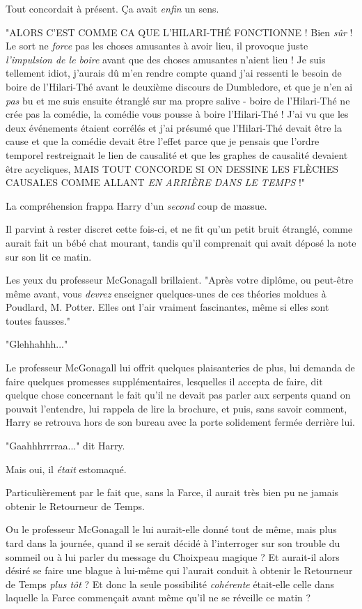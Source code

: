Tout concordait à présent. Ça avait \emph{enfin}  un sens.

"ALORS C'EST COMME CA QUE L'HILARI-THÉ FONCTIONNE ! Bien \emph{sûr}  ! Le sort ne \emph{force}  pas les choses amusantes à avoir lieu, il provoque juste \emph{l'impulsion de le boire}  avant que des choses amusantes n'aient lieu ! Je suis tellement idiot, j'aurais dû m'en rendre compte quand j'ai ressenti le besoin de boire de l'Hilari-Thé avant le deuxième discours de Dumbledore, et que je n'en ai \emph{pas}  bu et me suis ensuite étranglé sur ma propre salive - boire de l'Hilari-Thé ne crée pas la comédie, la comédie vous pousse à boire l'Hilari-Thé ! J'ai vu que les deux événements étaient corrélés et j'ai présumé que l'Hilari-Thé devait être la cause et que la comédie devait être l'effet parce que je pensais que l'ordre temporel restreignait le lien de causalité et que les graphes de causalité devaient être acycliques, MAIS TOUT CONCORDE SI ON DESSINE LES FLÈCHES CAUSALES COMME ALLANT \emph{EN ARRIÈRE DANS LE TEMPS}  !"

La compréhension frappa Harry d'un \emph{second}  coup de massue.

Il parvint à rester discret cette fois-ci, et ne fit qu'un petit bruit étranglé, comme aurait fait un bébé chat mourant, tandis qu'il comprenait qui avait déposé la note sur son lit ce matin.

Les yeux du professeur McGonagall brillaient. "Après votre diplôme, ou peut-être même avant, vous \emph{devrez } enseigner quelques-unes de ces théories moldues à Poudlard, M. Potter. Elles ont l'air vraiment fascinantes, même si elles sont toutes fausses."

"Glehhahhh..."

Le professeur McGonagall lui offrit quelques plaisanteries de plus, lui demanda de faire quelques promesses supplémentaires, lesquelles il accepta de faire, dit quelque chose concernant le fait qu'il ne devait pas parler aux serpents quand on pouvait l'entendre, lui rappela de lire la brochure, et puis, sans savoir comment, Harry se retrouva hors de son bureau avec la porte solidement fermée derrière lui.

"Gaahhhrrrraa..." dit Harry.

Mais oui, il \emph{était}  estomaqué.

Particulièrement par le fait que, sans la Farce, il aurait très bien pu ne jamais obtenir le Retourneur de Temps.

Ou le professeur McGonagall le lui aurait-elle donné tout de même, mais plus tard dans la journée, quand il se serait décidé à l'interroger sur son trouble du sommeil ou à lui parler du message du Choixpeau magique ? Et aurait-il alors désiré se faire une blague à lui-même qui l'aurait conduit à obtenir le Retourneur de Temps \emph{plus tôt}  ? Et donc la seule possibilité \emph{cohérente}  était-elle celle dans laquelle la Farce commençait avant même qu'il ne se réveille ce matin ?

